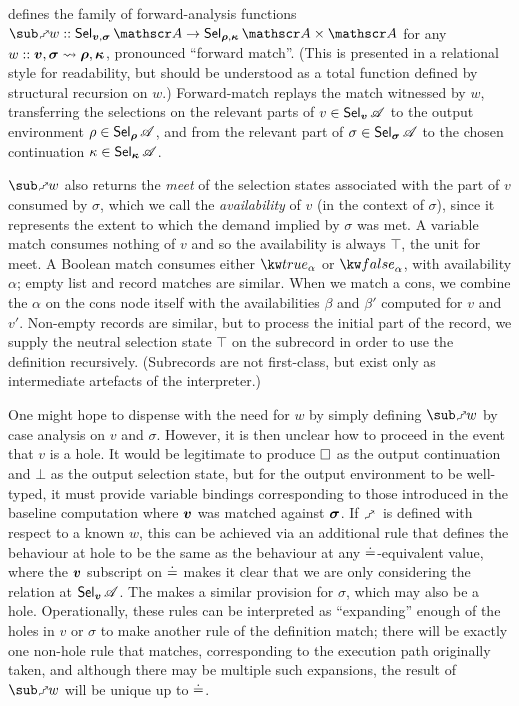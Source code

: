  defines the family of forward-analysis functions $\matchFwdF{w} :: \Sel{\raw{v}, \raw{\sigma}}{A} \to \Sel{\raw{\rho}, \raw{\kappa}}{A} \times \Ann{A}$ for any $w :: \bm{v}, \bm{\sigma} \rightsquigarrow \bm{\rho}, \bm{\kappa}$, pronounced ``forward match''. (This is presented in a relational style for readability, but should be understood as a total function defined by structural recursion on $w$.) Forward-match replays the match witnessed by $w$, transferring the selections on the relevant parts of $v \in \textup{\textsf{Sel}}_{\bm{v}}\,{\mathscr{A}}$ to the output environment $\rho \in \textup{\textsf{Sel}}_{\bm{\rho}}\,{\mathscr{A}}$, and from the relevant part of $\sigma \in \textup{\textsf{Sel}}_{\bm{\sigma}}\,{\mathscr{A}}$ to the chosen continuation $\kappa \in \textup{\textsf{Sel}}_{\bm{\kappa}}\,{\mathscr{A}}$.

$\matchFwdF{w}$ also returns the \emph{meet} of the selection states associated with the part of $v$ consumed by $\sigma$, which we call the \emph{availability} of $v$ (in the context of $\sigma$), since it represents the extent to which the demand implied by $\sigma$ was met. A variable match consumes nothing of $v$ and so the availability is always $\top$, the unit for meet. A Boolean match consumes either $\annot{\exTrue}{\alpha}$ or $\annot{\exFalse}{\alpha}$, with availability $\alpha$; empty list and record matches are similar. When we match a cons, we combine the $\alpha$ on the cons node itself with the availabilities $\beta$ and $\beta'$ computed for $v$ and $v'$. Non-empty records are similar, but to process the initial part of the record, we supply the neutral selection state $\top$ on the subrecord in order to use the definition recursively. (Subrecords are not first-class, but exist only as intermediate artefacts of the interpreter.)

One might hope to dispense with the need for $w$ by simply defining $\matchFwdF{w}$ by case analysis on $v$ and $\sigma$. However, it is then unclear how to proceed in the event that $v$ is a hole. It would be legitimate to produce $\square$ as the output continuation and $\bot$ as the output selection state, but for the output environment to be well-typed, it must provide variable bindings corresponding to those introduced in the baseline computation where $\bm{v}$ was matched against $\bm{\sigma}$. If $\matchFwdS$ is defined with respect to a known $w$, this can be achieved via an additional rule  that defines the behaviour at hole to be the same as the behaviour at any $\doteq$-equivalent value, where the $\bm{v}$ subscript on $\doteq$ makes it clear that we are only considering the relation at $\textup{\textsf{Sel}}_{\bm{v}}\,{\mathscr{A}}$. The  makes a similar provision for $\sigma$, which may also be a hole. Operationally, these rules can be interpreted as ``expanding'' enough of the holes in $v$ or $\sigma$ to make another rule of the definition match; there will be exactly one non-hole rule that matches, corresponding to the execution path originally taken, and although there may be multiple such expansions, the result of $\matchFwdF{w}$ will be unique up to $\doteq$.


